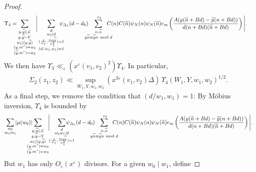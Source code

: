 \documentclass{amsart}
\numberwithin{equation}{section}
\begin{document}
\begin{proof}
\begin{align*}
&\Upsilon_4 =\!\!\!\!\!\sum_{\substack{y, \widetilde{y} \in \mathcal{L}  \\ y, \widetilde{y} \sim Y \\ w_1 \mid (y, \widetilde{y}) \\ (y,m^*)=w_2 \\ (\widetilde{y},m^*)=w_2}}\!\Bigg|\sum_{\substack{d \\ w_1 \mid d  \\  (\frac{d}{w_1}, \frac{my\widetilde{y}}{w_1^2})=1 \\ (d/w_1,w_1)=1  
}} \!\!\!\!\!\!\psi_{\Delta_1}(d-d_0)\!\!\!\!\!\sum_{\substack{n, \widetilde{n}\\ y\widetilde{n} \equiv 
\widetilde{y}n  \mbox{ \scriptsize mod } d }}^{\,\,*_3} \!\!\!\!\!\!\! C(n)  C(\widetilde{n})\psi_N(n)\psi_N(\widetilde{n}) e_{m}\left(\dfrac{A (y(\widetilde{n}+B d)-  \widetilde{y}(n+B d))}{d(n+B d)(\widetilde{n}+B d)}\right)\Bigg|.
\end{align*} 
We then have $\Upsilon_3 \ll_\varepsilon (x^\varepsilon(v_1,v_2)^2 )\Upsilon_4$. In particular,
\begin{align*}
\Sigma_2(z_1,z_2) \ll \sup_{W_1,Y,w_1,w_2} (x^{3\varepsilon}(v_1,v_2)\Delta) \, \Upsilon_4(W_1,Y,w_1,w_2)^{1/2}.
\end{align*}
 As a final step, we  remove the condition that $(d/w_1,w_1)=1$: By Möbius inversion,  $\Upsilon_4$ is bounded by 
\begin{align*}
\sum_{\substack{w_0 \\ w_0 \mid w_1 }} \!\!|\mu(w_0)|\!\!\!\!\!\!\!\sum_{\substack{y, \widetilde{y} \in \mathcal{L} \\ y, \widetilde{y} \sim Y \\ w_1 \mid (y, \widetilde{y}) \\ (y,m^*)=w_2 \\ (\widetilde{y},m^*)=w_2}}\!\! \Bigg|\!\!\sum_{\substack{d \\ w_0w_1 \mid d  \\  (\frac{d}{w_1}, \frac{my\widetilde{y}}{w_1^2})=1}}   \!\!\!\!\!\!\!\!\!\!\psi_{\Delta_1}(d-d_0)\!\!\!\!\!\!\sum_{\substack{n, \widetilde{n} \\ y\widetilde{n} \equiv 
\widetilde{y}n  \mbox{ \scriptsize mod } d }}^{\,\,*_3} \!\!\!\!\!\!\! C(n)  C(\widetilde{n}) \psi_N(n)\psi_N(\widetilde{n})e_{m}\left(\dfrac{A (y(\widetilde{n}+B d)-  \widetilde{y}(n+B d))}{d(n+B d)(\widetilde{n}+B d)}\right)\Bigg|.
\end{align*}
But $w_1$ has only $O_\varepsilon(x^\varepsilon)$ divisors. For a given $w_0 \mid w_1$, define

\end{proof}
\end{document}
